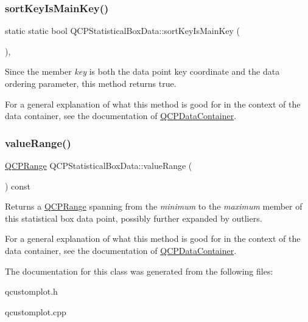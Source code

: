 \subsubsection{\texorpdfstring{sort\+Key\+Is\+Main\+Key()}{sortKeyIsMainKey()}}
{\footnotesize\ttfamily static static bool Q\+C\+P\+Statistical\+Box\+Data\+::sort\+Key\+Is\+Main\+Key (\begin{DoxyParamCaption}{ }\end{DoxyParamCaption})\hspace{0.3cm}{\ttfamily [inline]}, {\ttfamily [static]}}

Since the member {\itshape key} is both the data point key coordinate and the data ordering parameter, this method returns true.

For a general explanation of what this method is good for in the context of the data container, see the documentation of \hyperlink{class_q_c_p_data_container}{Q\+C\+P\+Data\+Container}. \mbox{\label{class_q_c_p_statistical_box_data_a1a2410fcf3d45fa3a1ad09e265b9bcad}} 
\subsubsection{\texorpdfstring{value\+Range()}{valueRange()}}
{\footnotesize\ttfamily \hyperlink{class_q_c_p_range}{Q\+C\+P\+Range} Q\+C\+P\+Statistical\+Box\+Data\+::value\+Range (\begin{DoxyParamCaption}{ }\end{DoxyParamCaption}) const\hspace{0.3cm}{\ttfamily [inline]}}

Returns a \hyperlink{class_q_c_p_range}{Q\+C\+P\+Range} spanning from the {\itshape minimum} to the {\itshape maximum} member of this statistical box data point, possibly further expanded by outliers.

For a general explanation of what this method is good for in the context of the data container, see the documentation of \hyperlink{class_q_c_p_data_container}{Q\+C\+P\+Data\+Container}. 

The documentation for this class was generated from the following files\+:\begin{DoxyCompactItemize}
\item 
qcustomplot.\+h\item 
qcustomplot.\+cpp\end{DoxyCompactItemize}
